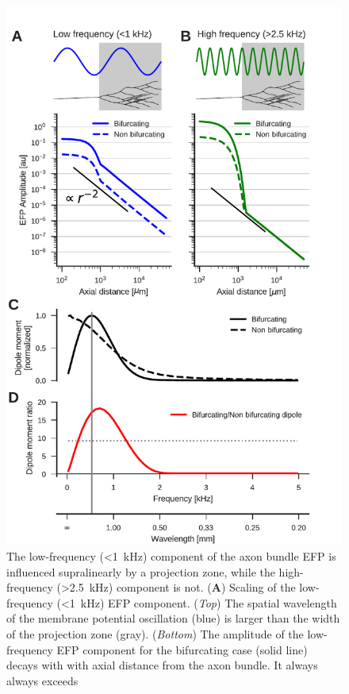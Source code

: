 \documentclass[]{elife}
\begin{document}
\begin{figure}[htbp]
\centering
\includegraphics[height=0.65\vsize]{figs/fig_3.pdf}
\caption{\label{fig:distscaling}The low-frequency (\textless{}1~kHz)
component of the axon bundle EFP is influenced supralinearly by a
projection zone, while the high-frequency (\textgreater{}2.5~kHz)
component is not. (\textbf{A}) Scaling of the low-frequency
(\textless{}1~kHz) EFP component. (\emph{Top}) The spatial wavelength of
the membrane potential oscillation (blue) is larger than the width of
the projection zone (gray). (\emph{Bottom}) The amplitude of the
low-frequency EFP component for the bifurcating case (solid line) decays
with with axial distance from the axon bundle. It always always exceeds
}
\end{figure}
\end{document}
